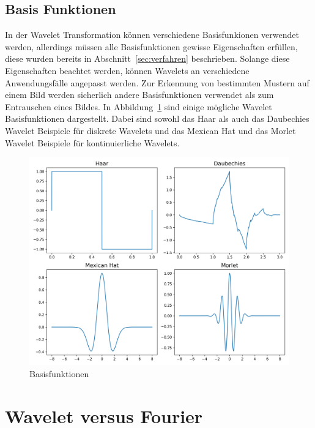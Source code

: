 \documentclass[12pt, a4paper, ngerman]{article}
\begin{document}
\subsection{Basis Funktionen}
\label{sec:basis_functions}

In der Wavelet Transformation können verschiedene Basisfunkionen verwendet werden,
allerdings müssen alle Basisfunktionen gewisse Eigenschaften erfüllen,
diese wurden bereits in Abschnitt~\ref{sec:verfahren} beschrieben.
Solange diese Eigenschaften beachtet werden,
können Wavelets an verschiedene Anwendungsfälle angepasst werden.
Zur Erkennung von bestimmten Mustern auf einem Bild
werden sicherlich andere Basisfunktionen verwendet als zum Entrauschen eines Bildes.
In Abbildung~\ref{fig:basis_functions} sind einige mögliche Wavelet Basisfunktionen dargestellt.
Dabei sind sowohl das Haar als auch das Daubechies Wavelet Beispiele für diskrete Wavelets
und das Mexican Hat und das Morlet Wavelet Beispiele für kontinuierliche Wavelets.

\begin{figure}
  \centering
  \includegraphics[width=\textwidth]{wavelets.png}
  \caption{Basisfunktionen}
  \label{fig:basis_functions}
\end{figure}

\section{Wavelet versus Fourier}
\end{document}

